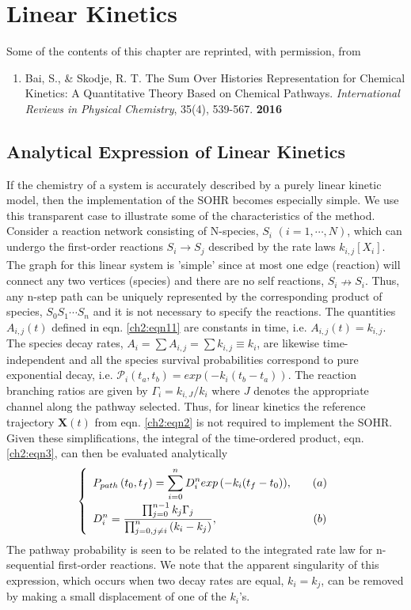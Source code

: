 \chapter{Linear Kinetics}
\label{chapter:linear_kinetics}
Some of the contents of this chapter are reprinted, with permission, from \
\begin{enumerate}
\item[\cite{ch4_10_bai2016sum}] Bai, S., \& Skodje, R. T. The Sum Over Histories Representation for Chemical Kinetics: A Quantitative Theory Based on Chemical Pathways. \textit{International Reviews in Physical Chemistry}, 35(4), 539-567. \textbf{2016}
\end{enumerate}
\section{Analytical Expression of Linear Kinetics}
\label{ch2dot5:sec:analytical}
If the chemistry of a system is accurately described by a purely linear kinetic model,
then the implementation of the SOHR becomes especially simple. We use this transparent
case to illustrate some of the characteristics of the method. Consider a reaction network
consisting of N-species, $S_i$ $(i = 1, \cdots, N)$, which can undergo the first-order
reactions $S_i \xrightarrow[]{} S_j$ described by the rate laws $k_{i,j}[X_i]$. The graph for this linear system is
'simple' since at most one edge (reaction) will connect any two vertices (species) and
there are no self reactions, $S_i \nrightarrow S_i$. Thus, any n-step path can be uniquely represented
by the corresponding product of species, $S_0S_1 \cdots S_n$ and it is not necessary to specify
the reactions. The quantities $A_{i,j}(t)$ defined in eqn. \ref{ch2:eqn11} are constants in time, i.e.
$A_{i,j}(t) = k_{i,j}$. The species decay rates, $A_i = \sum{A_{i,j}} = \sum{k_{i,j}} \equiv k_i$, are likewise time-independent
and all the species survival probabilities correspond to pure exponential decay, i.e.
${\mathcal{P}}_{i}(t_a, t_b)=exp\left(-k_i(t_b-t_a)\right)$. The reaction branching ratios are given by $\Gamma_i=k_{i,J}/k_i$ where
$J$ denotes the appropriate channel along the pathway selected. Thus, for linear kinetics
the reference trajectory $\mathbf{X}(t)$ from eqn. \ref{ch2:eqn2} is not required to implement the
SOHR. Given these simplifications, the integral of the time-ordered product, eqn. \ref{ch2:eqn3}, can then be evaluated analytically\cite{ch1_IRPC_16_ch3_6_ch4_8_bai2014sum}
\begin{eqnarray}
  \twochoices
	{P_{path} \left(t_0, t_f \right) = \sum_{i=0}^{n}{D_i^n exp \left( -k_i(t_f - t_0) \right)}, && (a)}
	{D_i^n = \frac{\prod_{j=0}^{n-1}{k_j\Gamma_j}}{\prod_{j=0,j \neq i}^{n}{ \left( k_i - k_j \right) }}, && (b)}
\label{ch2dot5:eqn1}
\end{eqnarray}
The pathway probability is seen to be related to the integrated rate law for n-sequential
first-order reactions.\cite{ch1_IRPC_47_abel1906besonders} We note that the apparent singularity of this expression, which
occurs when two decay rates are equal, $k_i = k_j$, can be removed by making a small displacement
of one of the $k_i$'s.
\newline
